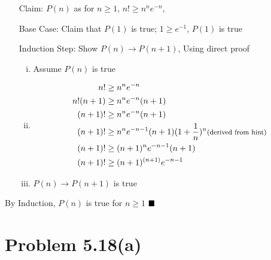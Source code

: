 \documentclass{article}
\def\math#1{$#1$}
\begin{document}
\begin{itemize}
    \item [Claim: ] \math{P(n)} as for \math{n \geq 1}, \math{n! \geq n^n{e}^{-n}}, 
    \item [Base Case: ] Claim that \math{P(1)} is true; \math{1 \geq e^{-1}}, \math{P(1)} is true
    \item [Induction Step: ] Show \math{P(n) \to P(n+1)}, Using direct proof 
        \begin{enumerate}[i)]
            \item Assume \math{P(n)} is true
            \item \begin{equation}
                    \begin{split}
                                n! & \geq n^n{e}^{-n}      \\
                                n!(n+1) & \geq n^n{e}^{-n}(n+1) \\
                                (n+1)!  & \geq n^n{e}^{-n}(n+1) \\
                                (n+1)!  & \geq n^n{e}^{-n-1}(n+1)(1+\frac{1}{n})^n \text{\footnotesize{(derived from hint)}} \\
                                (n+1)!  & \geq (n+1)^n{e}^{-n-1}(n+1) \\
                                (n+1)!  & \geq (n+1)^{(n+1)}{e}^{-n-1} \\
                        \end{split}
                \end{equation}
            \item \math{P(n) \to P(n+1)} is true
        \end{enumerate}
\end{itemize}

By Induction, \math{P(n)} is true for \math{n \geq 1} \math{\hfill{\blacksquare}}

\section{Problem 5.18(a)}
\end{document}
